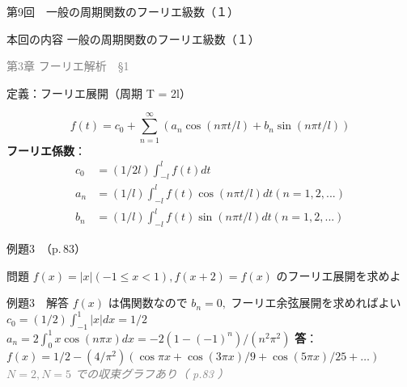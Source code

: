 \documentclass[professionalfonts]{beamer}
\begin{document}
\begin{frame}{第9回　一般の周期関数のフーリエ級数（１）}
  \begin{block}{本回の内容}
  一般の周期関数のフーリエ級数（１）
  \end{block}
  \vfill\hfill{\scriptsize \textcolor{gray}{第3章 フーリエ解析　§1}}
\end{frame}

\begin{frame}{定義：フーリエ展開（周期 T = 2l）}
  \begin{block}{}
  \[
    f(t) = c_{0} + \sum_{n=1}^\infty (a_{n}\cos(n\pi t/l) + b_{n}\sin(n\pi t/l))
  \]
  \medskip\textbf{フーリエ係数}：
  \begin{align*}
    c_{0} &= (1/2l) \int_{-l}^{l} f(t) dt \\
    a_{n} &= (1/l) \int_{-l}^{l} f(t)\cos(n\pi t/l) dt  (n = 1, 2, ...) \\
    b_{n} &= (1/l) \int_{-l}^{l} f(t)\sin(n\pi t/l) dt  (n = 1, 2, ...)
  \end{align*}
  \end{block}
\end{frame}

\begin{frame}{例題3　（p.\,83）}
  \begin{exampleblock}{問題}
    $f(x) = |x| (-1 \leq x < 1), f(x+2) = f(x)$ のフーリエ展開を求めよ\\[2pt]
  \end{exampleblock}
\end{frame}

\begin{frame}{例題3　解答}
  $f(x)$ は偶関数なので $b_{n} = 0,$ フーリエ余弦展開を求めればよい\\[4pt]
  $c_{0} = (1/2)\int_{-1}^{1} |x| dx = 1/2$\\[4pt]
  $a_{n} = 2\int_{0}^{1} x \cos(n\pi x) dx = -2(1-(-1)^n)/(n^{2}\pi^{2})$
  \medskip\textbf{答}：$f(x) = 1/2 - (4/\pi^{2})(\cos \pi x + \cos(3\pi x)/9 + \cos(5\pi x)/25 + \ldots)$
  {\footnotesize \textcolor{gray}{\textit{$N=2, N=5$ での収束グラフあり（ p.83 ）}}}
\end{frame}
\end{document}
